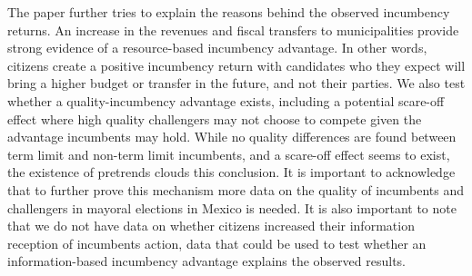 \documentclass[12pt]{amsart}
\numberwithin{equation}{section}
\theoremstyle{definition}
\theoremstyle{definition}
\theoremstyle{definition}
\begin{document}
The paper further tries to explain the reasons behind the observed incumbency returns. An increase in the revenues and fiscal transfers to municipalities provide strong evidence of a resource-based incumbency advantage. In other words, citizens create a positive incumbency return with candidates who they expect will bring a higher budget or transfer in the future, and not their parties. We also test whether a quality-incumbency advantage exists, including a potential scare-off effect where high quality challengers may not choose to compete given the advantage incumbents may hold. While no quality differences are found between term limit and non-term limit incumbents, and a scare-off effect seems to exist, the existence of pretrends clouds this conclusion. It is important to acknowledge that to further prove this mechanism more data on the quality of incumbents and challengers in mayoral elections in Mexico is needed. It is also important to note that we do not have data on whether citizens increased their information reception of incumbents action, data that could be used to test whether an information-based incumbency advantage explains the observed results. 




\clearpage               

 
    
\end{document}
